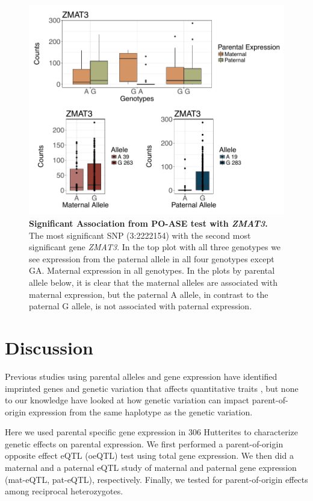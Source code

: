 \begin{figure}[!htb]
\centering \includegraphics[width=5in]{img/ch04/ZMAT3.pdf}
\caption[Significant Association from PO-ASE test with \emph{ZMAT3}.]{\textbf{Significant Association from PO-ASE test with \emph{ZMAT3}.} The most significant SNP (3:2222154) with the second most significant gene \emph{ZMAT3}. In the top plot with all three genotypes we see expression from the paternal allele in all four genotypes except GA. Maternal expression in all genotypes. In the plots by parental allele below, it is clear that the maternal alleles are associated with maternal expression, but the paternal A allele, in contrast to the paternal G allele, is not associated with paternal expression.}
\label{fig:ZMAT3}
\end{figure}
\clearpage


\section{Discussion}\label{ch04-discussion}

Previous studies using parental alleles and gene expression have identified imprinted genes and genetic variation that affects quantitative traits \cite{Zoledziewska:2015do,Baran:2015cx,Benonisdottir:2016dz,Garg2012a}, but none to our knowledge have looked at how genetic variation can impact parent-of-origin expression from the same haplotype as the genetic variation.

Here we used parental specific gene expression in 306 Hutterites to characterize genetic effects on parental expression. We first performed a parent-of-origin opposite effect eQTL (oeQTL) test using total gene expression. We then did a maternal and a paternal eQTL study of maternal and paternal gene expression (mat-eQTL, pat-eQTL), respectively. Finally, we tested for parent-of-origin effects among reciprocal heterozygotes.

